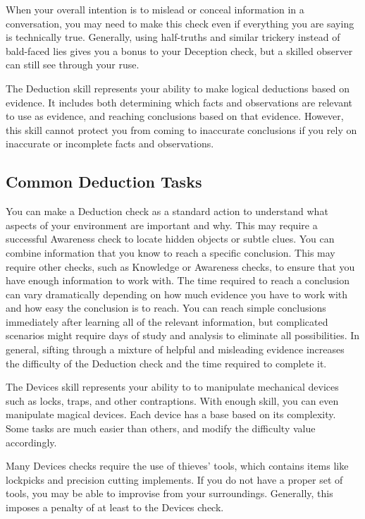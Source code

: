     When your overall intention is to mislead or conceal information in a conversation, you may need to make this check even if everything you are saying is technically true.
    Generally, using half-truths and similar trickery instead of bald-faced lies gives you a bonus to your Deception check, but a skilled observer can still see through your ruse.


\newpage
{}
  The Deduction skill represents your ability to make logical deductions based on evidence.
  It includes both determining which facts and observations are relevant to use as evidence, and reaching conclusions based on that evidence.
  However, this skill cannot protect you from coming to inaccurate conclusions if you rely on inaccurate or incomplete facts and observations.

  \subsection{Common Deduction Tasks}
     You can make a Deduction check as a standard action to understand what aspects of your environment are important and why.
    This may require a successful Awareness check to locate hidden objects or subtle clues.
     You can combine information that you know to reach a specific conclusion.
    This may require other checks, such as Knowledge or Awareness checks, to ensure that you have enough information to work with.
    The time required to reach a conclusion can vary dramatically depending on how much evidence you have to work with and how easy the conclusion is to reach.
    You can reach simple conclusions immediately after learning all of the relevant information, but complicated scenarios might require days of study and analysis to eliminate all possibilities.
    In general, sifting through a mixture of helpful and misleading evidence increases the difficulty of the Deduction check and the time required to complete it.

\newpage
{}
  The Devices skill represents your ability to to manipulate mechanical devices such as locks, traps, and other contraptions.
  With enough skill, you can even manipulate magical devices.
  Each device has a base  based on its complexity.
  Some tasks are much easier than others, and modify the difficulty value accordingly.

  Many Devices checks require the use of thieves' tools, which contains items like lockpicks and precision cutting implements.
  If you do not have a proper set of tools, you may be able to improvise from your surroundings.
  Generally, this imposes a penalty of at least  to the Devices check.


